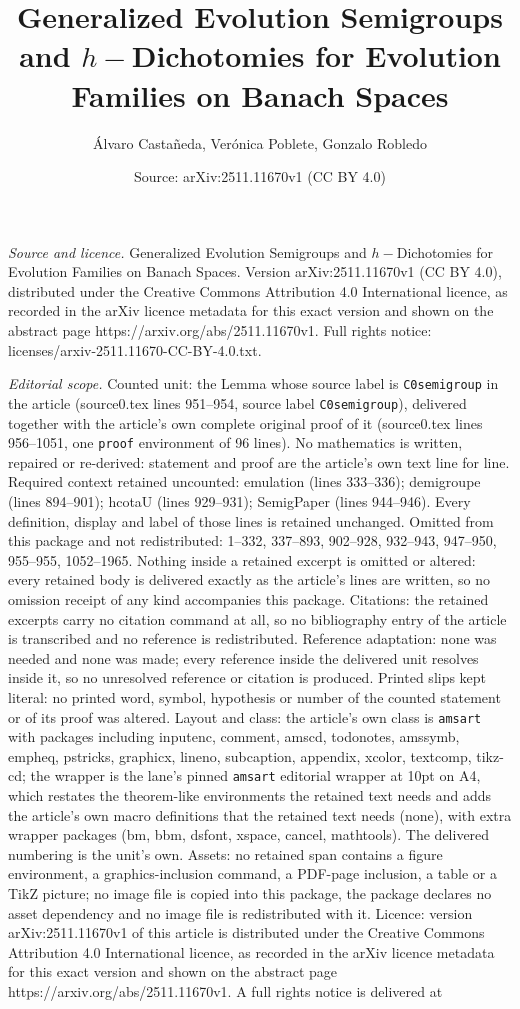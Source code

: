 \documentclass[10pt,a4paper]{amsart}
\title[Generalized Evolution Semigroups and $h-$Dichotomies for Evo]{Generalized Evolution Semigroups and $h-$Dichotomies for Evolution Families on Banach Spaces}
\author{\'Alvaro Casta\~neda, Ver\'onica Poblete, Gonzalo Robledo}
\date{Source: arXiv:2511.11670v1 (CC BY 4.0)}
\begin{document}
\maketitle

\noindent\emph{Source and licence.} Generalized Evolution Semigroups and $h-$Dichotomies for Evolution Families on Banach Spaces. Version arXiv:2511.11670v1 (CC BY 4.0), distributed under the Creative Commons Attribution 4.0 International licence, as recorded in the arXiv licence metadata for this exact version and shown on the abstract page https://arxiv.org/abs/2511.11670v1. Full rights notice: licenses/arxiv-2511.11670-CC-BY-4.0.txt.\par\smallskip

\noindent\textit{Editorial scope.} Counted unit: the Lemma whose source label is \texttt{C0semigroup} in the article (source0.tex lines 951--954, source label \texttt{C0semigroup}), delivered together with the article's own complete original proof of it (source0.tex lines 956--1051, one \texttt{proof} environment of 96 lines). No mathematics is written, repaired or re-derived: statement and proof are the article's own text line for line. Required context retained uncounted: emulation (lines 333--336); demigroupe (lines 894--901); hcotaU (lines 929--931); SemigPaper (lines 944--946). Every definition, display and label of those lines is retained unchanged. Omitted from this package and not redistributed: 1--332, 337--893, 902--928, 932--943, 947--950, 955--955, 1052--1965. Nothing inside a retained excerpt is omitted or altered: every retained body is delivered exactly as the article's lines are written, so no omission receipt of any kind accompanies this package. Citations: the retained excerpts carry no citation command at all, so no bibliography entry of the article is transcribed and no reference is redistributed. Reference adaptation: none was needed and none was made; every reference inside the delivered unit resolves inside it, so no unresolved reference or citation is produced. Printed slips kept literal: no printed word, symbol, hypothesis or number of the counted statement or of its proof was altered. Layout and class: the article's own class is \texttt{amsart} with packages including inputenc, comment, amscd, todonotes, amssymb, empheq, pstricks, graphicx, lineno, subcaption, appendix, xcolor, textcomp, tikz-cd; the wrapper is the lane's pinned \texttt{amsart} editorial wrapper at 10pt on A4, which restates the theorem-like environments the retained text needs and adds the article's own macro definitions that the retained text needs (none), with extra wrapper packages (bm, bbm, dsfont, xspace, cancel, mathtools). The delivered numbering is the unit's own. Assets: no retained span contains a figure environment, a graphics-inclusion command, a PDF-page inclusion, a table or a TikZ picture; no image file is copied into this package, the package declares no asset dependency and no image file is redistributed with it. Licence: version arXiv:2511.11670v1 of this article is distributed under the Creative Commons Attribution 4.0 International licence, as recorded in the arXiv licence metadata for this exact version and shown on the abstract page https://arxiv.org/abs/2511.11670v1. A full rights notice is delivered at 
\end{document}
